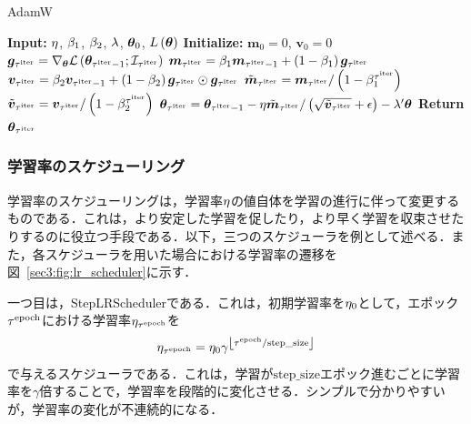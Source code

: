 \documentclass[12pt]{jarticle}
\numberwithin{equation}{section}    %
\numberwithin{figure}{section}      %
\numberwithin{table}{section}      %
\begin{document}
\begin{algorithm}
    \caption{AdamW}
    \label{sec3:algo:adamw}
    \begin{algorithmic}[1]
        \State \textbf{Input:} $\eta$, $\beta_{1}$, $\beta_{2}$, $\lambda$, $\bm{\theta}_{0}$, $L\left(\bm{\theta}\right)$
        \State \textbf{Initialize:} $\bm{m}_{0} = 0$, $\bm{v}_{0} = 0$
        \State $\bm{g}_{\tau^{\text{iter}}} = \nabla_{\bm{\theta}} \mathcal{L}\left(\bm{\theta}_{\tau^{\text{iter}} - 1}; \mathcal{I}_{\tau^{\text{iter}}}\right)$
        \State $\bm{m}_{\tau^{\text{iter}}} = \beta_{1} \bm{m}_{\tau^{\text{iter}} - 1} + \left(1 - \beta_{1}\right) \bm{g}_{\tau^{\text{iter}}}$
        \State $\bm{v}_{\tau^{\text{iter}}} = \beta_{2} \bm{v}_{\tau^{\text{iter}} - 1} + \left(1 - \beta_{2}\right) \bm{g}_{\tau^{\text{iter}}} \odot \bm{g}_{\tau^{\text{iter}}}$
        \State $\tilde{\bm{m}}_{\tau^{\text{iter}}} = \bm{m}_{\tau^{\text{iter}}} / \left(1 - \beta_{1}^{\tau^{\text{iter}}}\right)$
        \State $\tilde{\bm{v}}_{\tau^{\text{iter}}} = \bm{v}_{\tau^{\text{iter}}} / \left(1 - \beta_{2}^{\tau^{\text{iter}}}\right)$
        \State $\bm{\theta}_{\tau^{\text{iter}}} = \bm{\theta}_{\tau^{\text{iter}} - 1} - \eta \tilde{\bm{m}}_{\tau^{\text{iter}}} / \left(\sqrt{\tilde{\bm{v}}_{\tau^{\text{iter}}}} + \epsilon\right) - \lambda' \bm{\theta}$
        \EndFor
        \State \textbf{Return} $\bm{\theta}_{\tau^{\text{iter}}}$
    \end{algorithmic}
\end{algorithm}

\subsubsection{学習率のスケジューリング}
学習率のスケジューリングは，学習率$\eta$の値自体を学習の進行に伴って変更するものである．これは，より安定した学習を促したり，より早く学習を収束させたりするのに役立つ手段である．以下，三つのスケジューラを例として述べる．また，各スケジューラを用いた場合における学習率の遷移を図~\ref{sec3:fig:lr_scheduler}に示す．

一つ目は，StepLRSchedulerである．これは，初期学習率を$\eta_{0}$として，エポック$\tau^{\text{epoch}}$における学習率$\eta_{\tau^{\text{epoch}}}$を
\begin{equation}
    \eta_{\tau^{\text{epoch}}} = \eta_{0} \gamma^{\left\lfloor \tau^{\text{epoch}} / \text{step\_size} \right\rfloor}
\end{equation}
で与えるスケジューラである．これは，学習が$\text{step\_size}$エポック進むごとに学習率を$\gamma$倍することで，学習率を段階的に変化させる．シンプルで分かりやすいが，学習率の変化が不連続的になる．
\end{document}

